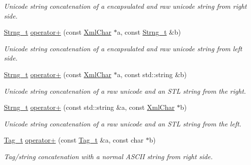 \begin{DoxyCompactItemize}
\begin{DoxyCompactList}\small\item\em Unicode string concatenation of a encapsulated and raw unicode string from right side. \end{DoxyCompactList}\item 
\hyperlink{class_d_d4hep_1_1_x_m_l_1_1_strng__t}{Strng\+\_\+t} \hyperlink{group___d_d4_h_e_p___x_m_l_gafe9f9443003bbab38d67856960e62071}{operator+} (const \hyperlink{namespace_d_d4hep_1_1_x_m_l_a09e5d9cc86ed782f6826dfe0778c1815}{Xml\+Char} $\ast$a, const \hyperlink{class_d_d4hep_1_1_x_m_l_1_1_strng__t}{Strng\+\_\+t} \&b)
\begin{DoxyCompactList}\small\item\em Unicode string concatenation of a encapsulated and raw unicode string from left side. \end{DoxyCompactList}\item 
\hyperlink{class_d_d4hep_1_1_x_m_l_1_1_strng__t}{Strng\+\_\+t} \hyperlink{group___d_d4_h_e_p___x_m_l_ga818876f0e3a3be20c11eeb6ea2871bdc}{operator+} (const \hyperlink{namespace_d_d4hep_1_1_x_m_l_a09e5d9cc86ed782f6826dfe0778c1815}{Xml\+Char} $\ast$a, const std\+::string \&b)
\begin{DoxyCompactList}\small\item\em Unicode string concatenation of a raw unicode and an S\+TL string from the right. \end{DoxyCompactList}\item 
\hyperlink{class_d_d4hep_1_1_x_m_l_1_1_strng__t}{Strng\+\_\+t} \hyperlink{group___d_d4_h_e_p___x_m_l_ga2158e654f7603cf773042a5cb231f398}{operator+} (const std\+::string \&a, const \hyperlink{namespace_d_d4hep_1_1_x_m_l_a09e5d9cc86ed782f6826dfe0778c1815}{Xml\+Char} $\ast$b)
\begin{DoxyCompactList}\small\item\em Unicode string concatenation of a raw unicode and an S\+TL string from the left. \end{DoxyCompactList}\item 
\hyperlink{class_d_d4hep_1_1_x_m_l_1_1_tag__t}{Tag\+\_\+t} \hyperlink{group___d_d4_h_e_p___x_m_l_gacf5fdc46e1dad4d2935283ead3a4c0fd}{operator+} (const \hyperlink{class_d_d4hep_1_1_x_m_l_1_1_tag__t}{Tag\+\_\+t} \&a, const char $\ast$b)
\begin{DoxyCompactList}\small\item\em Tag/string concatenation with a normal A\+S\+C\+II string from right side. \end{DoxyCompactList}\item 

\end{DoxyCompactItemize}
